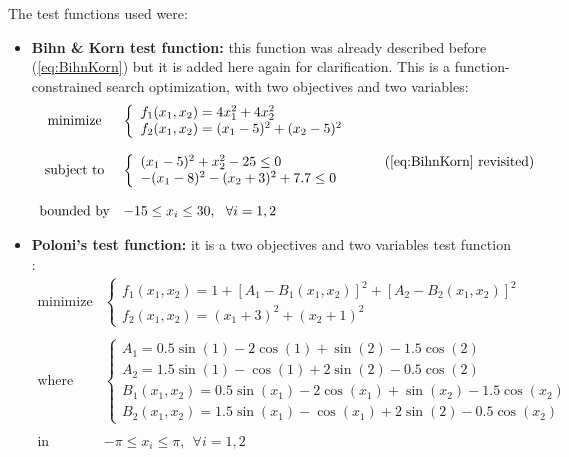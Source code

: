\newpage

The test functions used were:
\begin{itemize}
\item \textbf{Bihn \& Korn test function:} this function was already described before (\ref{eq:BihnKorn}) but it is added here again for clarification. This is a function-constrained search optimization, with two objectives and two variables:
    \begin{equation}
        \begin{array}{cl}
            \textrm{minimize} & 
            \left\{ \begin{array}{l}
                f_1(x_1,x_2) = 4x_1^2 + 4x_2^2\\
                f_2(x_1,x_2) = (x_1-5)^2+(x_2-5)^2
            \end{array} \right. \\
            & \\
            \textrm{subject to} &  
            \left\{ \begin{array}{l}
                (x_1-5)^2+x_2^2-25 \leq 0\\
                -(x_1-8)^2-(x_2+3)^2 + 7.7 \leq 0
            \end{array} \right. \\
            & \\
            \textrm{bounded by} & -15 \leq x_i \leq 30, \ \ \forall i = 1,2
        \end{array}
        \tag{\ref{eq:BihnKorn} revisited}
    \end{equation}

\item \textbf{Poloni's test function:} it is a two objectives and two variables test function \cite{poloni1995hybrid}:
    \begin{equation}
\begin{array}{cl}
            \textrm{minimize} & 
            \left\{ \begin{array}{l}
                f_1(x_1,x_2) = 1+\left[A_1-B_1(x_1,x_2)\right]^2+\left[A_2-B_2(x_1,x_2)\right]^2\\
                f_2(x_1,x_2) = (x_1+3)^2+(x_2+1)^2
            \end{array} \right. \\
            & \\
            \textrm{where} & 
            \left\{ \begin{array}{l}
                A_1 = 0.5\sin(1)-2\cos(1)+\sin(2)-1.5\cos(2) \\
                A_2 = 1.5\sin(1)-\cos(1)+2\sin(2)-0.5\cos(2) \\
                B_1(x_1,x_2) = 0.5\sin(x_1)-2\cos(x_1)+\sin(x_2)-1.5\cos(x_2) \\
                B_2(x_1,x_2) = 1.5\sin(x_1)-\cos(x_1)+2\sin(2)-0.5\cos(x_2)
            \end{array} \right. \\
            & \\
            \textrm{in} & -\pi \leq x_i \leq \pi, \ \ \forall i = 1,2
        \end{array}
        \label{eq:poloni}
    \end{equation}


\end{itemize}
